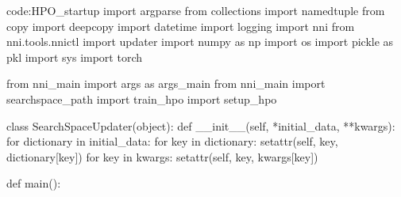 \begin{mycodebox}{code:HPO_startup}
import argparse
from collections import namedtuple
from copy import deepcopy
import datetime
import logging
import nni
from nni.tools.nnictl import updater
import numpy as np
import os
import pickle as pkl
import sys
import torch

from nni_main import args as args_main
from nni_main import searchspace_path
import train_hpo
import setup_hpo

class SearchSpaceUpdater(object):
    def __init__(self, *initial_data, **kwargs):
        for dictionary in initial_data:
            for key in dictionary:
                setattr(self, key, dictionary[key])
        for key in kwargs:
            setattr(self, key, kwargs[key])


def main():


\end{mycodebox}
